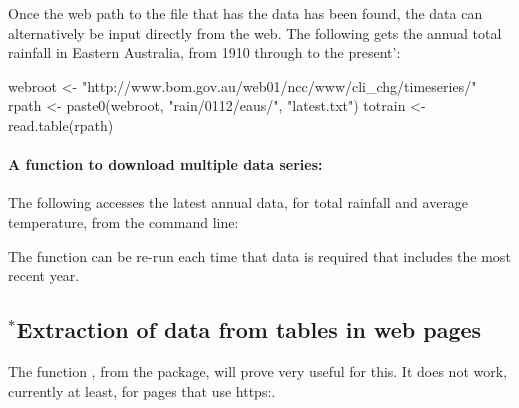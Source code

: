 Once the web path to the file that has the data has been found,
the data can alternatively be input directly from the web.
The following gets the annual total rainfall in Eastern Australia,
from 1910 through to the present':
\begin{fullwidth}
\begin{Schunk}
\begin{Sinput}
webroot <- "http://www.bom.gov.au/web01/ncc/www/cli_chg/timeseries/"
rpath <- paste0(webroot, "rain/0112/eaus/", "latest.txt")
totrain <- read.table(rpath)
\end{Sinput}
\end{Schunk}
\end{fullwidth}

\paragraph{A function to download multiple data series:}
The following accesses the latest annual data, for total rainfall
and average temperature, from the command line:
\begin{fullwidth}
\begin{Schunk}
\end{Schunk}
\end{fullwidth}
\noindent
The function can be re-run each time that data is required that
includes the most recent year.

\subsection*{$^*$Extraction of data from tables in web pages}

The function , from the  package,
will prove very useful for this.  It does not work, currently at
least, for pages that use https:.

